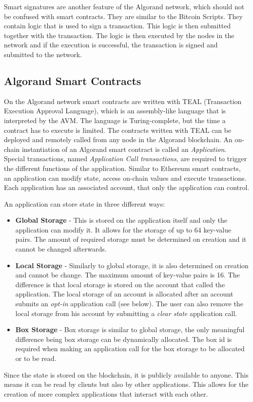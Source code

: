 Smart signatures are another feature of the Algorand network, which should not be confused with smart contracts. They are similar to the Bitcoin Scripts. They contain logic that is used to sign a transaction. This logic is then submitted together with the transaction. The logic is then executed by the nodes in the network and if the execution is successful, the transaction is signed and submitted to the network.

\subsection*{Algorand Smart Contracts} \label{section:algorand-smartcontracts}
On the Algorand network smart contracts are written with TEAL (Transaction Execution Approval Language), which is an assembly-like language that is interpreted by the \ac{AVM}. The language is Turing-complete, but the time a contract has to execute is limited. The contracts written with TEAL can be deployed and remotely called from any node in the Algorand blockchain. An on-chain instantiation of an Algorand smart contract is called an \textit{Application}. Special transactions, named \textit{Application Call transactions}, are required to trigger the different functions of the application. Similar to Ethereum smart contracts, an application can modify state, access on-chain values and execute transactions. Each application has an associated account, that only the application can control.

An application can store state in three different ways:
\begin{itemize}
    \item \textbf{Global Storage} - This is stored on the application itself and only the application can modify it. It allows for the storage of up to 64 key-value pairs. The amount of required storage must be determined on creation and it cannot be changed afterwards.
    \item \textbf{Local Storage} - Similarly to global storage, it is also determined on creation and cannot be change. The maximum amount of key-value pairs is 16. The difference is that local storage is stored on the account that called the application. The local storage of an account is allocated after an account submits an \textit{opt-in} application call (see below). The user can also remove the local storage from his account by submitting a \textit{clear state} application call.
    \item \textbf{Box Storage} - Box storage is similar to global storage, the only meaningful difference being box storage can be dynamically allocated. The box id is required when making an application call for the box storage to be allocated or to be read.
\end{itemize}
Since the state is stored on the blockchain, it is publicly available to anyone. This means it can be read by clients but also by other applications. This allows for the creation of more complex applications that interact with each other.

